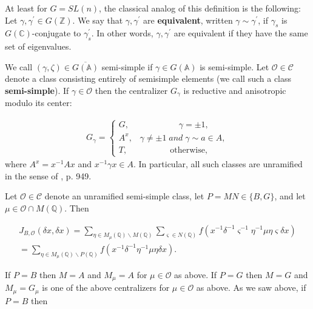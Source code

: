 At least for $G=SL(n)$, the classical analog of this definition is the
following: Let $\gamma ,\gamma ^{\prime }\in G({\mathbb{Z}})$. We say that
$\gamma ,\gamma ^{\prime }$ are \textbf{equivalent}, written $\gamma \sim
\gamma ^{\prime }$, if $\gamma _s$ is $G(\mathbb{C})$-conjugate to $\gamma
_s^{\prime } $. In other words, $\gamma ,\gamma ^{\prime }$ are equivalent
if they have the same set of eigenvalues.

We call $(\gamma ,\zeta)\in \overline{G({\mathbb{A}})}$
semi-simple if $\gamma\in G({\mathbb{A}})$ is semi-simple.
Let ${\mathcal{O}}\in \mathcal{C}$ denote a
class consisting entirely of semisimple
elements (we call such a class \textbf{semi-simple}).
If $\gamma \in {\mathcal{O}}$
then the centralizer $G_\gamma $ is reductive and anisotropic modulo its
center:

\begin{equation}\label{eq:4.12}
\begin{array}{c}
G_\gamma =\left\{ 
\begin{array}{c}
G,\;\;\;\;\;\;\;\;\;\;\;\;\;\;\;\;\;\;\;\;\;\gamma =\pm 1, \\ 
A^x,\;\;\;\gamma \neq \pm 1\;and\;\gamma \sim a\in A, \\ 
T,\;\;\;\;\;\;\;\;\;\;\;\;\;\;\;\;\;\;\mathrm{otherwise},
\end{array}
\right.
\end{array}
\end{equation}
where $A^x=x^{-1}Ax$ and $x^{-1}\gamma x\in A$.
In particular, all such classes are unramified in the sense of
\cite{A2}, p. 949.

Let ${\mathcal{O}}\in \mathcal{C}$ denote an unramified
semi-simple class, let $P=MN\in\{B,G\}$, and let
$\mu \in {\mathcal{O}}\cap M({\mathbb{Q}})$.
Then

\begin{equation}\label{eq:4.13}
\begin{array}{c}
J_{B,{\mathcal{O}}}(\delta x,\delta x)
=\sum_{\eta \in M_\mu ( {\mathbb{Q}})\backslash M(\mathbb{Q})}
\sum_{\varsigma \in N({\mathbb{Q}})}
f(x^{-1}\delta ^{-1}\varsigma ^{-1}\eta^{-1}\mu \eta \varsigma \delta x) \\ 
=\sum_{\eta \in M_\mu ({\mathbb{Q}})\backslash P({\mathbb{Q}})}
f(x^{-1}\delta^{-1}\eta ^{-1}\mu \eta \delta x).
\end{array}
\end{equation}

If $P=B$ then $M=A$ and $M_\mu =A$ for
$\mu \in {\mathcal{O}}$ as above. If $P=G$ then
$M=G$ and $M_\mu =G_\mu $ is one of the above
centralizers for $\mu \in {\mathcal{O}}$ as
above. As we saw above, if $P=B$ then

